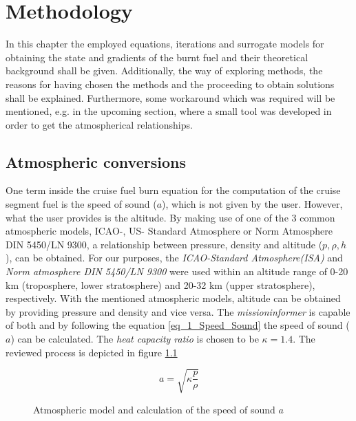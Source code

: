 
\chapter{Methodology}
\label{chap_Methodlogy}
In this chapter the employed equations, iterations and 
surrogate models for 
obtaining the state and gradients of the burnt fuel and their theoretical 
background shall be given. Additionally, the 
way of exploring methods, the reasons for 
having chosen the methods and the proceeding to obtain solutions
shall be explained. Furthermore, some workaround which was 
required will be mentioned, e.g. in the upcoming section, 
where a small tool was developed in order to get 
the atmospherical relationships.

\section{Atmospheric conversions}
One term inside the cruise fuel burn equation
for the computation of the cruise segment fuel
is the speed of sound ($a$), which 
is not given by the user. However, what the user provides is 
the altitude. By making use of one of the 3 common atmospheric models,
ICAO-, US- Standard Atmosphere or Norm Atmosphere DIN 5450/LN 9300, 
a relationship between pressure, density and altitude 
($p, \rho, h$), can be obtained. For our purposes, the
\emph{ICAO-Standard Atmosphere(ISA)} and 
\emph{Norm atmosphere DIN 5450/LN 9300} were used within an altitude range 
of 0-20 km (troposphere, lower stratosphere) 
and 20-32 km (upper stratosphere), respectively. With the mentioned 
atmospheric models, altitude can be obtained by providing 
pressure and density and vice versa. The \emph{missioninformer} is
capable of both and by following the equation \eqref{eq_1_Speed_Sound} 
the speed of sound ($a$) can be calculated. The \emph{heat capacity ratio} is chosen 
to be $\kappa = 1.4$. The reviewed process is 
depicted in figure \ref{fig_3_Atmospheric}

\begin{equation}
    a = \sqrt{\kappa \frac{p}{\rho}}
    \label{eq_1_Speed_Sound}
\end{equation}

\begin{figure}[!h]
    \def\svgwidth{\linewidth}
    
    \caption{Atmospheric model and calculation of the speed of sound $a$}
    \label{fig_3_Atmospheric}
\end{figure}


